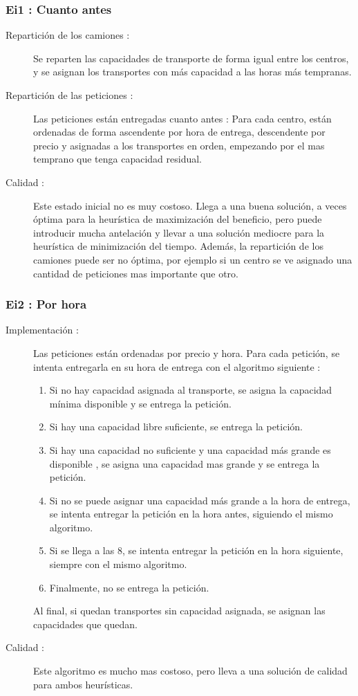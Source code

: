 \documentclass{article}
\begin{document}
\subsubsection{Ei1 : Cuanto antes}

\begin{description}
\item[Repartición de los camiones :] Se reparten las capacidades de transporte
de forma igual entre los centros, y se asignan los transportes con más capacidad
a las horas más tempranas.
\item[Repartición de las peticiones :] Las peticiones están entregadas cuanto
antes : Para cada centro, están ordenadas de forma ascendente por hora de
entrega, descendente por precio y asignadas a los transportes en orden,
empezando por el mas temprano que tenga capacidad residual.
\item[Calidad :] Este estado inicial no es muy costoso. Llega a una buena
solución, a veces óptima para la heurística de maximización del beneficio, pero
puede introducir mucha antelación y llevar a una solución mediocre para la
heurística de minimización del tiempo. Además, la repartición de los camiones
puede ser no óptima, por ejemplo si un centro se ve asignado una cantidad de
peticiones mas importante que otro.
\end{description}

\subsubsection{Ei2 : Por hora}

\begin{description}
\item[Implementación :] Las peticiones están ordenadas por precio y hora. Para
cada petición, se intenta entregarla en su hora de entrega con el algoritmo
siguiente :
\begin{enumerate}
\item Si no hay capacidad asignada al transporte, se asigna la capacidad mínima
disponible y se entrega la petición.
\item Si hay una capacidad libre suficiente, se entrega la petición.
\item Si hay una capacidad no suficiente y una capacidad más grande es
disponible , se asigna una capacidad mas grande y se entrega la petición.
\item Si no se puede asignar una capacidad más grande a la hora de entrega, se
intenta entregar la petición en la hora antes, siguiendo el mismo algoritmo.
\item Si se llega a las 8, se intenta entregar la petición en la hora siguiente,
siempre con el mismo algoritmo.
\item Finalmente, no se entrega la petición.
\end{enumerate}
Al final, si quedan transportes sin capacidad asignada, se asignan las
capacidades que quedan.
\item[Calidad :] Este algoritmo es mucho mas costoso, pero lleva a una solución
de calidad para ambos heurísticas.
\end{description}
\end{document}
